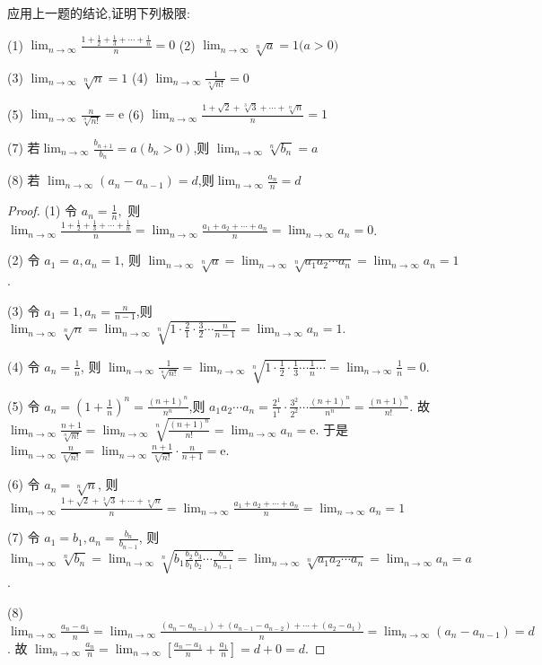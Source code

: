 \begin{practice}
    应用上一题的结论,证明下列极限:

    (1) $\lim_{n\to\infty} \frac{1+\frac12+\frac13+\cdots+\frac1n}n=0$ \qquad (2) $\lim_{n\to\infty}\sqrt[n]{a}=1\text{($a>0$)}$

    (3) $\lim_{n\to\infty}\sqrt[n]{n}=1$ \qquad (4) $\lim_{n\to\infty}\frac1{\sqrt[n]{n!}}=0$

    (5) $\lim_{n\to\infty}\frac{n}{\sqrt[n]{n!}}=\text{e}$ \qquad (6) $\lim_{n\to\infty}\frac{1+\sqrt{2}+\sqrt[3]{3}+\cdots+\sqrt[n]{n}}{n}=1$

    (7) 若$\lim_{n\to\infty}\frac{b_{n+1}}{b_{n}}=a(b_{n}>0)$,则 $\lim_{n\to\infty}\sqrt[n]{b_{n}}=a$
    
    (8) 若 $\lim_{n\to\infty}(a_n-a_{n-1})=d$,则$\lim_{n\to\infty}\frac{a_n}n=d$
\end{practice}

\begin{proof}
    (1) 令 $a_n=\frac{1}{n},$ 则  $\lim_{n\to\infty} \frac{1+\frac12+\frac13+\cdots+\frac1n}n=\lim_{n\to\infty}\frac{a_1+a_2+\cdots+a_n}n=\lim_{n\to\infty} a_n=0$.

    (2) 令 $a_1=a,a_n=1$, 则 $\lim_{n\to\infty}\sqrt[n]{a}=\lim_{n\to\infty}\sqrt[n]{a_1a_2\cdots a_n}=\lim_{n\to\infty} a_n= 1$.

    (3) 令 $a_1=1,a_n=\frac{n}{n-1}$,则 $\lim_{n\to\infty}\sqrt[n]{n}=\lim_{n\to\infty}\sqrt[n]{1\cdot \frac{2}{1}\cdot \frac{3}{2}\cdots \frac{n}{n-1}}=\lim_{n\to\infty} a_n= 1$.

    (4) 令 $a_n=\frac{1}{n}$, 则 $\lim_{n\to\infty}\frac1{\sqrt[n]{n!}}=\lim_{n\to\infty} \sqrt[n]{1\cdot \frac{1}{2}\cdot \frac{1}{3}\cdots \frac{1}{n}\cdots}=\lim_{n\to\infty} \frac{1}{n}=0$.

    (5) 令 $a_n=(1+\frac{1}{n})^n=\frac{(n+1)^n}{n^n}$,则 $a_1a_2\cdots a_n = \frac{2^1}{1^1}\cdot \frac{3^2}{2^2}\cdots \frac{{(n+1)}^{n}}{{n}^{n}}=\frac{(n+1)^n}{n!}$. 故 $\lim_{n\to\infty} \frac{n+1}{\sqrt[n]{n!}} =\lim_{n\to\infty} \sqrt[n]{\frac{(n+1)^n}{n!}} = \lim_{n\to\infty} a_n = \text{e}$. 于是 $\lim_{n\to\infty}\frac{n}{\sqrt[n]{n!}}=\lim_{n\to\infty} \frac{n+1}{\sqrt[n]{n!}}\cdot \frac{n}{n+1}=\text{e}$.

    (6) 令 $a_n=\sqrt[n]{n}$, 则 $\lim_{n\to\infty}\frac{1+\sqrt{2}+\sqrt[3]{3}+\cdots+\sqrt[n]{n}}{n}=\lim_{n\to\infty}\frac{a_1+a_2+\cdots+a_n}n=\lim_{n\to\infty} a_n=1$

    (7) 令 $a_1=b_1,a_n=\frac{b_{n}}{b_{n-1}}$, 则 $\lim_{n\to\infty}\sqrt[n]{b_{n}}
    =\lim_{n\to\infty}\sqrt[n]{b_1\frac{b_{2}}{b_{1}}\frac{b_{3}}{b_{2}}\cdots \frac{b_{n}}{b_{n-1}}}=\lim_{n\to\infty}\sqrt[n]{a_1a_2\cdots a_n}=\lim_{n\to\infty} a_n=a$.

    (8) $\lim_{n\to\infty} \frac{a_n-a_1}{n}=\lim_{n\to\infty} \frac{(a_n-a_{n-1})+(a_{n-1}-a_{n-2})+\cdots + (a_2-a_1)}{n}=\lim_{n\to\infty} (a_n-a_{n-1})=d$. 故 $\lim_{n\to\infty}\frac{a_n}n=\lim_{n\to\infty} [\frac{a_n-a_1}n+\frac{a_1}{n}]=d+0=d$.
\end{proof}


